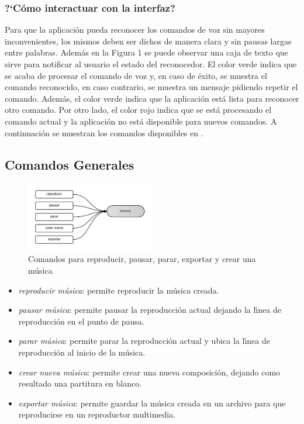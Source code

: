 \subsubsection{{?`}C\'omo interactuar con la interfaz?}
Para que la aplicaci\'on pueda reconocer los comandos de voz sin mayores inconvenientes, los mismos
deben ser dichos de manera clara y sin pausas largas entre palabras. Adem\'as en la Figura 1 se puede
observar una caja de texto que sirve para notificar al usuario el estado del reconocedor. El color verde
indica que se acaba de procesar el comando  de voz   y,  en caso de  \'exito, se muestra el comando
reconocido, en caso contrario, se muestra un mensaje pidiendo repetir el comando.  Adem\'as, el color
verde indica que la aplicaci\'on est\'a lista para reconocer otro comando. Por otro lado, el color rojo indica
que se est\'a procesando el comando actual y la aplicaci\'on no est\'a disponible para nuevos comandos.
A continuaci\'on se muestran los comandos disponibles en .

\subsection{Comandos Generales}

\begin{figure}[H] 
\centering
\includegraphics[width=0.5\textwidth]{./graphics/cmd-musica.png}
\caption{Comandos para reproducir, pausar, parar, exportar y crear una m\'usica}
\label{figure:cmd-crear-musica-anexo}
\end{figure}

\begin{itemize}
\item \emph{reproducir m\'usica}: permite reproducir la m\'usica creada.
\item \emph{pausar m\'usica}: permite pausar la reproducci\'on actual dejando la l{\'\i}nea de reproducci\'on en el
punto de pausa.
\item \emph{parar m\'usica}: permite parar la reproducci\'on actual y ubica la l{\'\i}nea de reproducci\'on al inicio de
la m\'usica.
\item \emph{crear nueva m\'usica}:  permite crear una nueva composici\'on, dejando como resultado una
partitura en blanco.
\item \emph{exportar m\'usica}: permite guardar la m\'usica creada en un archivo para que reproducirse en un
reproductor multimedia.
\end{itemize}

